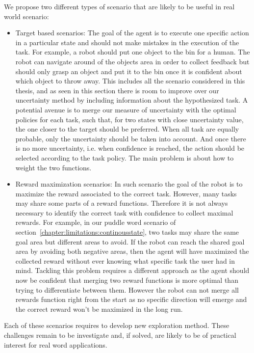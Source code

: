 We propose two different types of scenario that are likely to be useful in real world scenario: 
\begin{itemize}
\item Target based scenarios: The goal of the agent is to execute one specific action in a particular state and should not make mistakes in the execution of the task. For example, a robot should put one object to the bin for a human. The robot can navigate around of the objects area in order to collect feedback but should only grasp an object and put it to the bin once it is confident about which object to throw away. This includes all the scenario considered in this thesis, and as seen in this section there is room to improve over our uncertainty method by including information about the hypothesized task. A potential avenue is to merge our measure of uncertainty with the optimal policies for each task, such that, for two states with close uncertainty value, the one closer to the target should be preferred. When all task are equally probable, only the uncertainty should be taken into account. And once there is no more uncertainty, i.e. when confidence is reached, the action should be selected according to the task policy. The main problem is about how to weight the two functions.

\item Reward maximization scenarios: In such scenario the goal of the robot is to maximize the reward associated to the correct task. However, many tasks may share some parts of a reward functions. Therefore it is not always necessary to identify the correct task with confidence to collect maximal rewards. For example, in our puddle word scenario of section~\ref{chapter:limitations:continousstate}, two tasks may share the same goal area but different areas to avoid. If the robot can reach the shared goal area by avoiding both negative areas, then the agent will have maximized the collected reward without ever knowing what specific task the user had in mind. Tackling this problem requires a different approach as the agent should now be confident that merging two reward functions is more optimal than trying to differentiate between them. However the robot can not merge all rewards function right from the start as no specific direction will emerge and the correct reward won't be maximized in the long run.
\end{itemize}

Each of these scenarios requires to develop new exploration method. These challenges remain to be investigate and, if solved, are likely to be of practical interest for real word applications.

